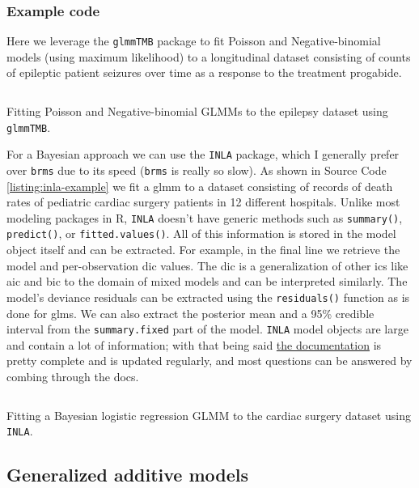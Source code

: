 \documentclass{report}
\begin{document}
\subsubsection{Example code}

Here we leverage the \texttt{glmmTMB} package to fit Poisson and Negative-binomial models (using maximum likelihood) to a longitudinal dataset consisting of counts of epileptic patient seizures over time as a response to the treatment progabide. 

\begin{listing}[h!]
\inputminted{r}{Example-Code/glmmtmb_count_regression.R}
\caption{Fitting Poisson and Negative-binomial GLMMs to the epilepsy dataset using \texttt{glmmTMB}.}
\label{listing:glmmtmb-example}
\end{listing}

For a Bayesian approach we can use the \texttt{INLA} package, which I generally prefer over \texttt{brms} due to its speed (\texttt{brms} is really so slow). As shown in Source Code \ref{listing:inla-example} we fit a \gls{glmm} to a dataset consisting of records of death rates of pediatric cardiac surgery patients in 12 different hospitals. Unlike most modeling packages in R, \texttt{INLA} doesn't have generic methods such as \texttt{summary()}, \texttt{predict()}, or \texttt{fitted.values()}. All of this information is stored in the model object itself and can be extracted. For example, in the final line we retrieve the model and per-observation \gls{dic} values. The \gls{dic} is a generalization of other \glspl{ic} like \gls{aic} and \gls{bic} to the domain of mixed models and can be interpreted similarly. The model's deviance residuals can be extracted using the \texttt{residuals()} function as is done for \glspl{glm}. We can also extract the posterior mean and a 95\% credible interval from the \texttt{summary.fixed} part of the model. \texttt{INLA} model objects are large and contain a lot of information; with that being said \href{https://www.r-inla.org/documentation}{the documentation} is pretty complete and is updated regularly, and most questions can be answered by combing through the docs. 

\begin{listing}[h!]
\inputminted{r}{Example-Code/inla_binomial_regression.R}
\caption{Fitting a Bayesian logistic regression GLMM to the cardiac surgery dataset using \texttt{INLA}.}
\label{listing:inla-example}
\end{listing}

\subsection{Generalized additive models}
\end{document}
